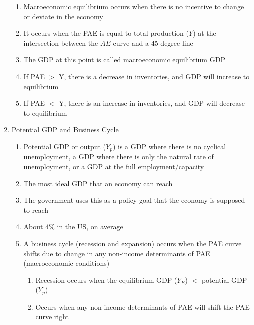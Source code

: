 \documentclass[12pt]{article}
\begin{document}
\begin{enumerate}
\begin{enumerate}
          \item Macroeconomic equilibrium occurs when there is no incentive to change or deviate in the economy

          \item It occurs when the PAE is equal to total production ($Y$) at the intersection between the $AE$ curve and a 45-degree line

          \item The GDP at this point is called macroeconomic equilibrium GDP

          \item If PAE $>$ Y, there is a decrease in inventories, and GDP will increase to equilibrium

          \item If PAE $<$ Y, there is an increase in inventories, and GDP will decrease to equilibrium

        \end{enumerate}

      \item Potential GDP and Business Cycle

        \begin{enumerate}

          \item Potential GDP or output ($Y_p$) is a GDP where there is no cyclical unemployment, a GDP where there is only the natural rate of unemployment, or a GDP at the full employment/capacity

          \item The most ideal GDP that an economy can reach

          \item The government uses this as a policy goal that the economy is supposed to reach

          \item About 4\% in the US, on average

          \item A business cycle (recession and expansion) occurs when the PAE curve shifts due to change in any non-income determinants of PAE (macroeconomic conditions)

            \begin{enumerate}

              \item Recession occurs when the equilibrium GDP ($Y_E$) $<$ potential GDP ($Y_p$)

              \item Occurs when any non-income determinants of PAE will shift the PAE curve right


\end{enumerate}
\end{enumerate}
\end{enumerate}
\end{document}
